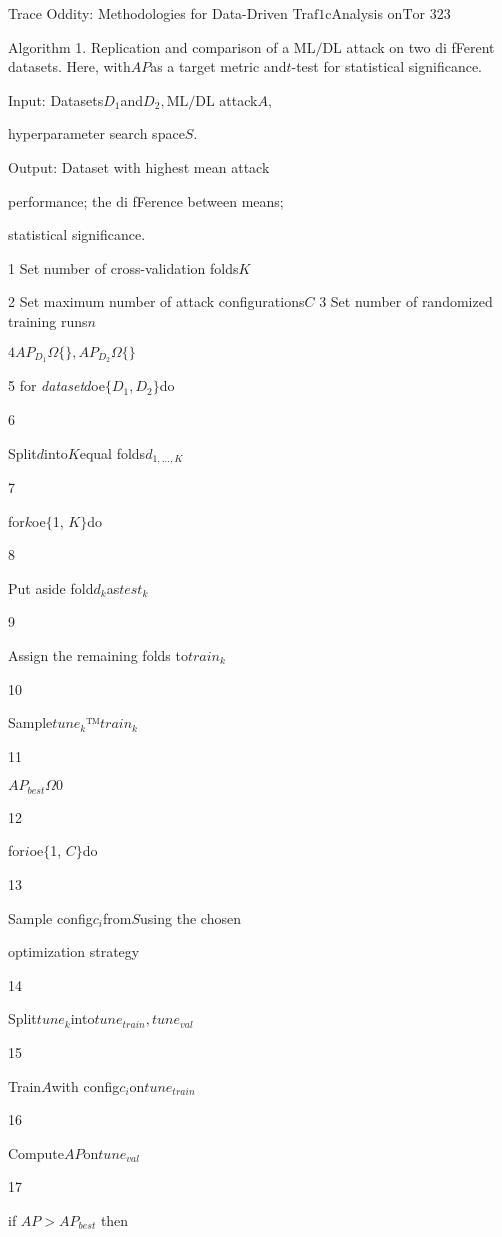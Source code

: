 \documentclass[a4paper,12pt]{article}
\begin{document}
Trace Oddity: Methodologies for Data-Driven Tra$\mathrm{f}1\mathrm{c}$Analysis on$\mathrm{Tor}$ 323

Algorithm 1. Replication and comparison of a $\mathrm{ML}/\mathrm{DL}$ attack on two di fFerent datasets. Here, with$AP$as a target metric and$t$-test for statistical significance.

Input: Datasets$D_{1}$and$D_{2}, \mathrm{ML}/\mathrm{DL}$ attack$A,$

hyperparameter search space$S.$

Output: Dataset with highest mean attack

performance; the di fFerence between means;

statistical significance.

1 Set number of cross-validation folds$K$

2 Set maximum number of attack configurations$C$ 3 Set number of randomized training runs$n$

$4AP_{D_{1}}\Omega\{\}, AP_{D_{2}}\Omega\{\}$

5 for {\it dataset}$d$oe$\{D_{1},D_{2}\}$do

6

Split$d$into$K$equal folds$d_{1,\ldots,K}$

7

for$k$oe$\{$1, $K\}$do

8

Put aside fold$d_{k}$as$test_{k}$

9

Assign the remaining folds to$train_{k}$

10

Sample$tune_{k}$™$train_{k}$

11

$AP_{best}\Omega 0$

12

for$i$oe$\{$1, $C\}$do

13

Sample config$c_{i}$from$S$using the chosen

optimization strategy

14

Split$tune_{k}$into$tune_{train}, tune_{val}$

15

Train$A$with config$c_{i}$on$tune_{train}$

16

Compute$AP$on$tune_{val}$

17

if $AP>AP_{best}$ then
\end{document}
